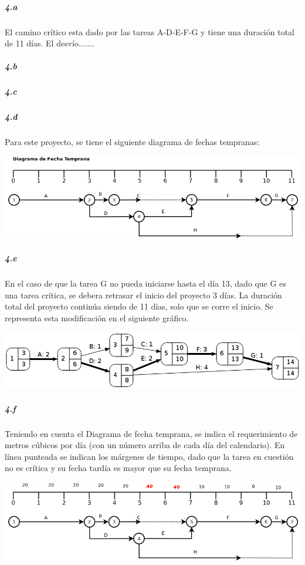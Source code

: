 \documentclass[a4paper,10pt]{article}
\begin{document}
  \subparagraph {4.a} El camino crítico esta dado por las tareas A-D-E-F-G y tiene una duración total de 11 días. El desvío....... %
  \subparagraph {4.b} %
  \subparagraph {4.c} %
  \subparagraph {4.d} Para este proyecto, se tiene el siguiente diagrama de fechas tempranas: 
    \begin{center}
    \includegraphics[scale=0.55,keepaspectratio=true]{img/ej4-fechatemprana.png} 
  \end{center}
  
  
  \subparagraph {4.e} En el caso de que la tarea G no pueda iniciarse hasta el día 13, dado que G es una tarea crítica, se debera retrasar el inicio del proyecto 3 días. 
  La duración total del proyecto continúa siendo de 11 días, solo que se corre el inicio. Se representa esta modificación en el siguiente gráfico.
  \begin{center}
    \includegraphics[scale=0.5,keepaspectratio=true]{img/ej4-e.png} 
  \end{center}
  
  \subparagraph {4.f} Teniendo en cuenta el Diagrama de fecha temprana, se indica el requerimiento de metros cúbicos por día (con un número arriba de cada día del calendario). 
  En línea punteada se indican los márgenes de tiempo, dado que la tarea en cuestión no es crítica y su fecha tardía es mayor que su fecha temprana.
  
  \begin{center}
    \includegraphics[scale=0.55,keepaspectratio=true]{img/ej4-fechatemprana1.png} 
  \end{center}
  
\end{document}
